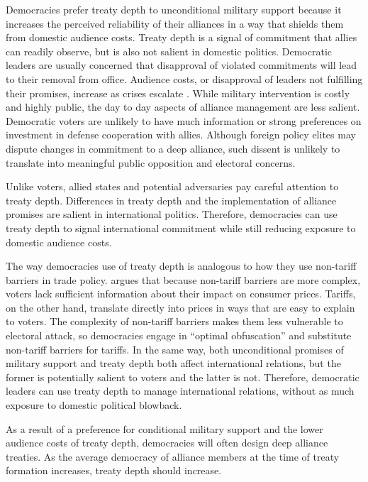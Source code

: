 \documentclass[12pt]{article}
\begin{document}
Democracies prefer treaty depth to unconditional military support because it increases the perceived reliability of their alliances in a way that shields them from domestic audience costs. 
Treaty depth is a signal of commitment that allies can readily observe, but is also not salient in domestic politics. 
Democratic leaders are usually concerned that disapproval of violated commitments will lead to their removal from office. 
Audience costs, or disapproval of leaders not fulfilling their promises, increase as crises escalate \citep{Tomz2007}. 
While military intervention is costly and highly public, the day to day aspects of alliance management are less salient. 
Democratic voters are unlikely to have much information or strong preferences on investment in defense cooperation with allies. 
Although foreign policy elites may dispute changes in commitment to a deep alliance, such dissent is unlikely to translate into meaningful public opposition and electoral concerns.


Unlike voters, allied states and potential adversaries pay careful attention to treaty depth. 
Differences in treaty depth and the implementation of alliance promises are salient in international politics. 
Therefore, democracies can use treaty depth to signal international commitment while still reducing exposure to domestic audience costs. 


The way democracies use of treaty depth is analogous to how they use non-tariff barriers in trade policy.
\citet{Kono2006} argues that because non-tariff barriers are more complex, voters lack sufficient information about their impact on consumer prices.
Tariffs, on the other hand, translate directly into prices in ways that are easy to explain to voters.
The complexity of non-tariff barriers makes them less vulnerable to electoral attack, so democracies engage in ``optimal obfuscation'' and substitute non-tariff barriers for tariffs. 
In the same way, both unconditional promises of military support and treaty depth both affect international relations, but the former is potentially salient to voters and the latter is not. 
Therefore, democratic leaders can use treaty depth to manage international relations, without as much exposure to domestic political blowback.


As a result of a preference for conditional military support and the lower audience costs of treaty depth, democracies will often design deep alliance treaties. 
As the average democracy of alliance members at the time of treaty formation increases, treaty depth should increase. 
\end{document}
